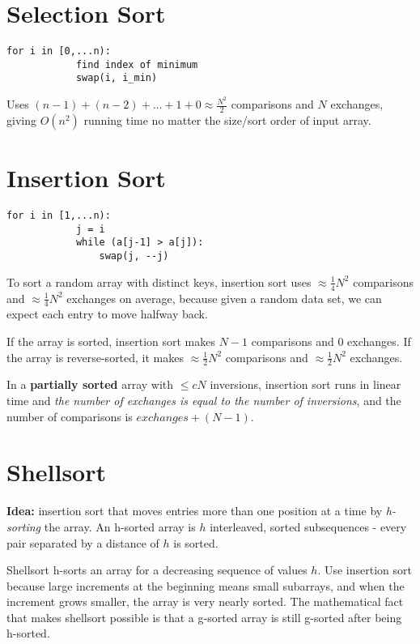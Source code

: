 \documentclass[11pt]{article}
\begin{document}
\section{Selection Sort}
	\begin{lstlisting}[autogobble=true]
		for i in [0,...n):
			find index of minimum
			swap(i, i_min)
	\end{lstlisting}
	
	Uses $(n-1)+(n-2)+\ldots +1+0 \approx \frac{N^2}{2}$ comparisons and $N$ exchanges, giving $O(n^2)$ running time no matter the size/sort order of input array.
	
\section{Insertion Sort}
	\begin{lstlisting}[autogobble=true]
		for i in [1,...n):
			j = i
			while (a[j-1] > a[j]):
				swap(j, --j)
	\end{lstlisting}
	
	To sort a random array with distinct keys, insertion sort uses $\approx \frac{1}{4}N^2$ comparisons and $\approx \frac{1}{4}N^2$ exchanges on average, because given a random data set, we can expect each entry to move halfway back.
	
	If the array is sorted, insertion sort makes $N-1$ comparisons and 0 exchanges. If the array is reverse-sorted, it makes $\approx \frac{1}{2}N^2$ comparisons and $\approx \frac{1}{2}N^2$ exchanges.
		
	In a \textbf{partially sorted} array with $\leq cN$ inversions, insertion sort runs in linear time and \emph{the number of exchanges is equal to the number of inversions}, and the number of comparisons is $exchanges + (N-1)$.
	
\section{Shellsort}
	\textbf{Idea:} insertion sort that moves entries more than one position at a time by \emph{h-sorting} the array. An h-sorted array is $h$ interleaved, sorted subsequences - every pair separated by a distance of $h$ is sorted.
	
	Shellsort h-sorts an array for a decreasing sequence of values $h$. Use insertion sort because large increments at the beginning means small subarrays, and when the increment grows smaller, the array is very nearly sorted. The mathematical fact that makes shellsort possible is that a g-sorted array is still g-sorted after being h-sorted.
	
\end{document}
